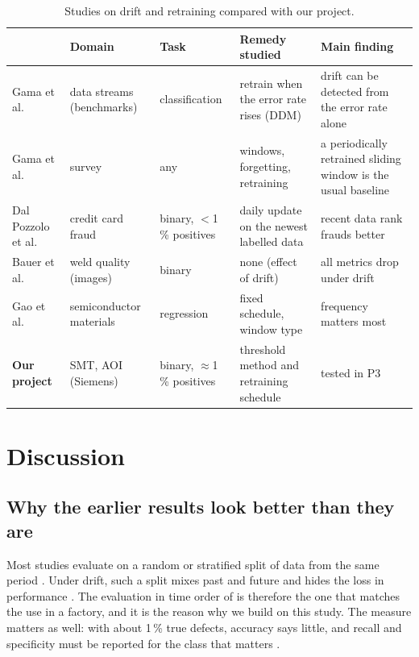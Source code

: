 \documentclass[11pt,a4paper]{article}
\begin{document}
\begin{table}[h]
\centering\small
\caption{Studies on drift and retraining compared with our project.}
\label{tab:drift}
\begin{tabularx}{\textwidth}{@{}p{2.4cm}p{2.6cm}LLL@{}}
\toprule
 & Domain & Task & Remedy studied & Main finding \\
\midrule
Gama et al.\ \cite{gama2004} & data streams (benchmarks) & classification & retrain when the error rate rises (DDM) & drift can be detected from the error rate alone \\
Gama et al.\ \cite{gama2014} & survey & any & windows, forgetting, retraining & a periodically retrained sliding window is the usual baseline \\
Dal Pozzolo et al.\ \cite{dalpozzolo2018} & credit card fraud & binary, $<$1\,\% positives & daily update on the newest labelled data & recent data rank frauds better \\
Bauer et al.\ \cite{bauer2025} & weld quality (images) & binary & none (effect of drift) & all metrics drop under drift \\
Gao et al.\ \cite{gao2026} & semiconductor materials & regression & fixed schedule, window type & frequency matters most \\
\textbf{Our project} & SMT, AOI (Siemens) & binary, $\approx$1\,\% positives & threshold method and retraining schedule & tested in P3 \\
\bottomrule
\end{tabularx}
\end{table}



\section{Discussion}

\subsection{Why the earlier results look better than they are}
Most studies evaluate on a random or stratified split of data from the same period \cite{thielen2020,albayari2026}. Under drift, such a split mixes past and future and hides the loss in performance \cite{gama2014}. The evaluation in time order of \cite{pfab2025} is therefore the one that matches the use in a factory, and it is the reason why we build on this study. The measure matters as well: with about 1\,\% true defects, accuracy says little, and recall and specificity must be reported for the class that matters \cite{he2009}.
\end{document}
